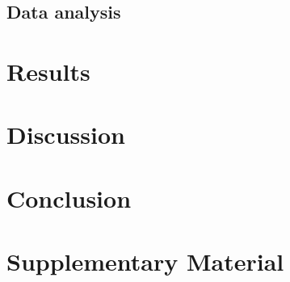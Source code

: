 \documentclass[11pt,a4paper]{article}
\newcommand{\beginsupplement}{%
	\setcounter{table}{0}
	\renewcommand{\thetable}{S\arabic{table}}%
	\setcounter{figure}{0}
	\renewcommand{\thefigure}{S\arabic{figure}}%
}
\begin{document}
\subsection{Data analysis}

\section{Results}

\section{Discussion}

\section{Conclusion}

\printbibliography

\section{Supplementary Material} \beginsupplement
\end{document}
